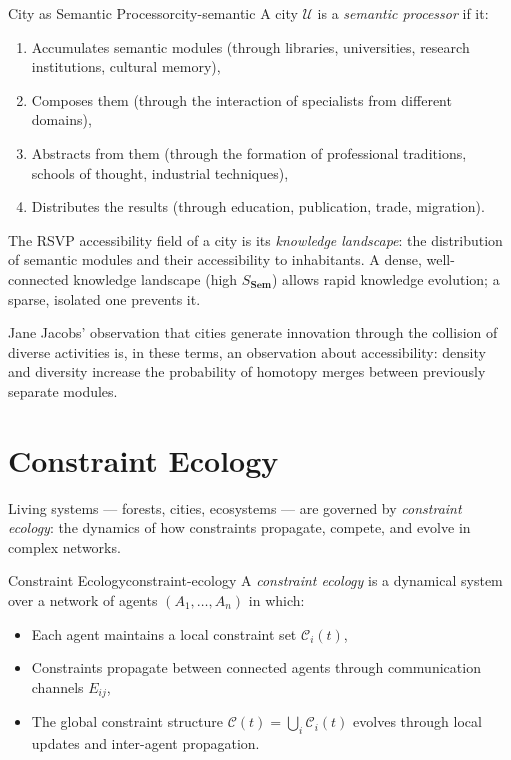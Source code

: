 \begin{definition}{City as Semantic Processor}{city-semantic}
  A city $\mathcal{U}$ is a \emph{semantic processor} if it:
  \begin{enumerate}
    \item Accumulates semantic modules (through libraries, universities,
          research institutions, cultural memory),
    \item Composes them (through the interaction of specialists from
          different domains),
    \item Abstracts from them (through the formation of professional
          traditions, schools of thought, industrial techniques),
    \item Distributes the results (through education, publication,
          trade, migration).
  \end{enumerate}
\end{definition}

The RSVP accessibility field of a city is its \emph{knowledge landscape}:
the distribution of semantic modules and their accessibility to inhabitants.
A dense, well-connected knowledge landscape (high $S_{\mathbf{Sem}}$)
allows rapid knowledge evolution; a sparse, isolated one prevents it.

Jane Jacobs' observation that cities generate innovation through the
collision of diverse activities is, in these terms, an observation about
accessibility: density and diversity increase the probability of homotopy
merges between previously separate modules.

\section{Constraint Ecology}

Living systems — forests, cities, ecosystems — are governed by
\emph{constraint ecology}: the dynamics of how constraints propagate,
compete, and evolve in complex networks.

\begin{definition}{Constraint Ecology}{constraint-ecology}
  A \emph{constraint ecology} is a dynamical system over a network of
  agents $(A_1, \ldots, A_n)$ in which:
  \begin{itemize}
    \item Each agent maintains a local constraint set $\mathcal{C}_i(t)$,
    \item Constraints propagate between connected agents through
          communication channels $E_{ij}$,
    \item The global constraint structure $\mathcal{C}(t) =
          \bigcup_i \mathcal{C}_i(t)$ evolves through
          local updates and inter-agent propagation.
  \end{itemize}
\end{definition}

